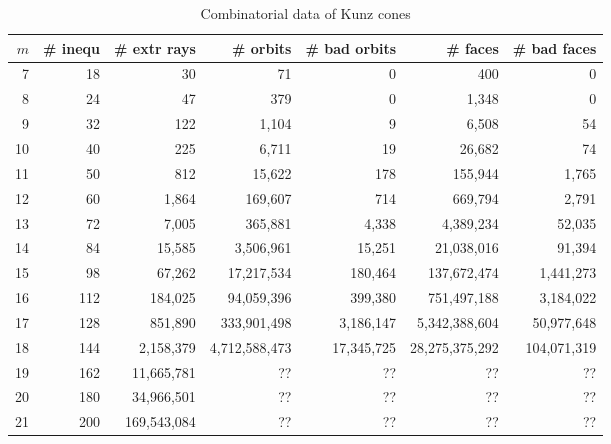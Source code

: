 \documentclass[12pt]{amsart}
\theoremstyle{definition}
\numberwithin{equation}{section}
\renewcommand\>{\rangle}
\newcommand\<{\langle}
\newcommand\0{\mathbf{0}}
\begin{document}
\begin{table}
	\begin{tabular}{r|r|r|r|r|r|r|}
		$m$ &\# inequ&\# extr rays& \# orbits&\# bad orbits&\# faces&\# bad faces\\
		\hline
		\hline
		7&18&30  &71 &0&400&0\\ 
		\hline
		8&24&47&379&0&1,348&0\\
		\hline
		9&32&122& 1,104& 9 &6,508&54\\
		\hline
		10&40&225 &6,711&19& 26,682&74\\  
		\hline
		11& 50&   812&15,622&178&155,944&1,765\\
		\hline
		12&60& 1,864& 169,607 & 714& 669,794 & 2,791\\
		\hline
		13&72& 7,005& 365,881& 4,338& 4,389,234& 52,035\\
		\hline
		14&84&15,585& 3,506,961 & 15,251& 21,038,016 & 91,394\\
		\hline
		15&98&67,262& 17,217,534& 180,464& 137,672,474& 1,441,273\\
		\hline
		16&112&184,025& 94,059,396 & 399,380 & 751,497,188 & 3,184,022\\
		\hline
		17&128& 851,890&333,901,498 & 3,186,147 & 5,342,388,604 & 50,977,648\\
		\hline
		18& 144 & 2,158,379 & 4,712,588,473 & 17,345,725 & 28,275,375,292 & 104,071,319\\
		\hline
		19& 162 & 11,665,781 &?? & ?? & ?? & ??\\
		\hline
		20& 180 & 34,966,501  &?? & ?? & ?? & ??\\
		\hline	
		21& 200 & 169,543,084 &?? & ?? & ?? & ??\\
		\hline		
	\end{tabular}
	\vspace*{1.5ex}
	\caption{Combinatorial data of Kunz cones}
	\label{tb:combinatorial}
\end{table}
\end{document}
